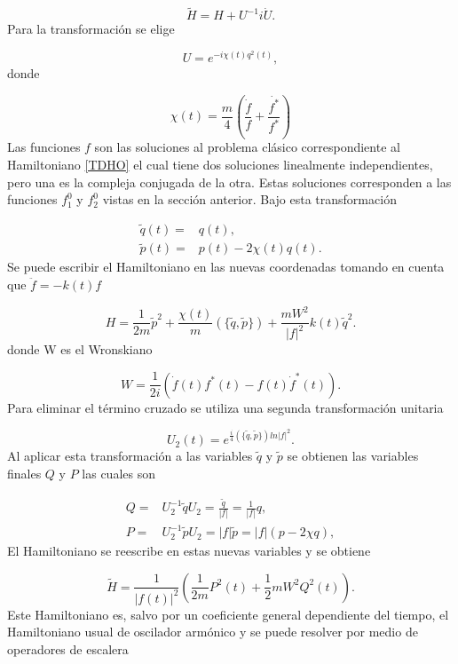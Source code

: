 \documentclass[10pt,a4paper]{report}
\begin{document}
\begin{equation}
\tilde{H} = H + U^{-1}i\dot{U}.
\end{equation} Para la transformación se elige

\begin{equation}
U = e^{-i\chi(t)q^2(t)},
\end{equation} donde

\begin{equation}
\chi(t) = \frac{m}{4}(\frac{\dot{f}}{f}+\frac{\dot{f^*}}{f^*})
\end{equation} Las funciones $f$ son las soluciones al problema clásico correspondiente al Hamiltoniano \eqref{TDHO} el cual tiene dos soluciones linealmente independientes, pero una es la compleja conjugada de la otra. Estas soluciones corresponden a las funciones $f_1^0$  y $f_2^0$ vistas en la sección anterior. Bajo esta transformación

\begin{align}
\tilde{q}(t)=&q(t),\\
\tilde{p}(t)=&p(t)-2\chi(t)q(t).
\end{align} Se puede escribir el Hamiltoniano en las nuevas coordenadas tomando en cuenta que $\ddot{f}= -k(t)f$

\begin{equation}
 H = \frac{1}{2m}\tilde{p}^2 + \frac{\chi(t)}{m}(\{\tilde{q},\tilde{p}\}) + \frac{mW^2}{|f|^2}k(t)\tilde{q}^2.
\end{equation} donde W es el Wronskiano

\begin{equation}
W=\frac{1}{2i}(\dot{f}(t)f^*(t)-f(t)\dot{f}^*(t)).
\end{equation} Para eliminar el término cruzado se utiliza una segunda transformación unitaria

\begin{equation}
U_2(t)=e^{\frac{i}{4}(\{\tilde{q},\tilde{p}\})ln|f|^2}.
\end{equation} Al aplicar esta transformación a las variables $\tilde{q}$ y $\tilde{p}$ se obtienen las variables finales $Q$ y $P$ las cuales son

\begin{align}
Q=&U_2^{-1}\tilde{q}U_2 = \frac{\tilde{q}}{|f|} =\frac{1}{|f|}q,\\
P=&U_2^{-1}\tilde{p}U_2 = |f|\tilde{p} =|f|(p-2\chi q), 
\end{align} El Hamiltoniano se reescribe en estas nuevas variables y se obtiene

\begin{equation}\label{QTDHO}
\tilde{H} = \frac{1}{|f(t)|^2}(\frac{1}{2m}P^2(t)+\frac{1}{2}mW^2Q^2(t)).
\end{equation}Este Hamiltoniano es, salvo por un coeficiente general dependiente del tiempo, el Hamiltoniano usual de oscilador armónico y se puede resolver por medio de operadores de escalera
\end{document}
